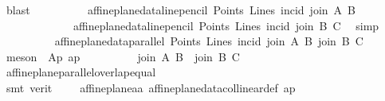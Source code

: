 \begin{isabellebody}
\ blast\isanewline
\ \ \ \ \ \ \ \ \isamarkupfalse%
\ {\isachardoublequoteopen}{\isacharparenleft}{\kern0pt}affine{\isacharunderscore}{\kern0pt}plane{\isacharunderscore}{\kern0pt}data{\isachardot}{\kern0pt}line{\isacharunderscore}{\kern0pt}pencil\ Points\ Lines\ {\isacharparenleft}{\kern0pt}incid{\isacharparenright}{\kern0pt}\ {\isacharparenleft}{\kern0pt}join\ A\ B{\isacharparenright}{\kern0pt}{\isacharparenright}{\kern0pt}\ {\isacharequal}{\kern0pt}\isanewline
\ \ \ \ \ \ \ \ \ \ \ \ \ {\isacharparenleft}{\kern0pt}affine{\isacharunderscore}{\kern0pt}plane{\isacharunderscore}{\kern0pt}data{\isachardot}{\kern0pt}line{\isacharunderscore}{\kern0pt}pencil\ Points\ Lines\ {\isacharparenleft}{\kern0pt}incid{\isacharparenright}{\kern0pt}\ {\isacharparenleft}{\kern0pt}join\ B\ C{\isacharparenright}{\kern0pt}{\isacharparenright}{\kern0pt}{\isachardoublequoteclose}\ \isamarkupfalse%
\ simp\isanewline
\ \ \ \ \ \ \ \ \isamarkupfalse%
\ {\isachardoublequoteopen}affine{\isacharunderscore}{\kern0pt}plane{\isacharunderscore}{\kern0pt}data{\isachardot}{\kern0pt}parallel\ Points\ Lines\ incid\ {\isacharparenleft}{\kern0pt}join\ A\ B{\isacharparenright}{\kern0pt}\ {\isacharparenleft}{\kern0pt}join\ B\ C{\isacharparenright}{\kern0pt}{\isachardoublequoteclose}\ \isamarkupfalse%
\ {\isacharparenleft}{\kern0pt}meson\ {\isachardoublequoteopen}{}{}{\isachardoublequoteclose}\ Ap{}{}\ ap{\isacharparenright}{\kern0pt}\isanewline
\ \ \ \ \ \ \ \ \isamarkupfalse%
\ {\isachardoublequoteopen}{\isacharparenleft}{\kern0pt}join\ A\ B{\isacharparenright}{\kern0pt}\ {\isacharequal}{\kern0pt}\ {\isacharparenleft}{\kern0pt}join\ B\ C{\isacharparenright}{\kern0pt}{\isachardoublequoteclose}\ \isamarkupfalse%
\ affine{\isacharunderscore}{\kern0pt}plane{\isachardot}{\kern0pt}parallel{\isacharunderscore}{\kern0pt}overlap{\isacharunderscore}{\kern0pt}equal\isanewline
\ \ \ \ \ \ \ \ \ \ \isamarkupfalse%
\ {\isacharparenleft}{\kern0pt}smt\ {\isacharparenleft}{\kern0pt}verit{\isacharparenright}{\kern0pt}\ {\isachardoublequoteopen}{}{\isachardoublequoteclose}\ {\isachardoublequoteopen}{}{\isachardoublequoteclose}\ {\isachardoublequoteopen}{}{\isachardoublequoteclose}\ {\isachardoublequoteopen}{}{\isachardoublequoteclose}\ affine{\isacharunderscore}{\kern0pt}plane{\isachardot}{\kern0pt}a{}a\ affine{\isacharunderscore}{\kern0pt}plane{\isacharunderscore}{\kern0pt}data{\isachardot}{\kern0pt}collinear{\isacharunderscore}{\kern0pt}def\ ap{\isacharparenright}{\kern0pt}\isanewline

\end{isabellebody}
